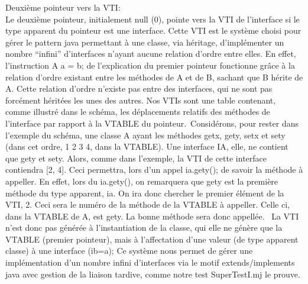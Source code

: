 Deuxième pointeur vers la VTI:\\
Le deuxième pointeur, initialement null (0), pointe vers la VTI de l'interface
si le type apparent du pointeur est une interface. Cette VTI est le système
choisi pour gérer le pattern java permettant à une classe, via héritage,
d'implémenter un nombre ``infini'' d'interfaces n'ayant aucune relation d'ordre
entre elles. En effet, l'instruction A a = b; de l'explication du premier
pointeur fonctionne grâce à la relation d'ordre existant entre les méthodes de A
et de B, sachant que B hérite de A. Cette relation d'ordre n'existe pas entre
des interfaces, qui ne sont pas forcément héritées les unes des autres.
Nos VTIs sont une table contenant, comme illustré dans le schéma, les déplacements
relatifs des méthodes de l'interface par rapport à la VTABLE du pointeur.\
Considérons, pour rester dans l'exemple du schéma, une classe A ayant les
méthodes getx, gety, setx et sety (dans cet ordre, 1 2 3 4, dans la VTABLE). Une
interface IA, elle, ne contient que gety et sety. Alors, comme dans l'exemple,
la VTI de cette interface contiendra [2, 4]. Ceci permettra, lors d'un appel
ia.gety(); de savoir la méthode à appeller. En effet, lors du ia.gety(), on
remarquera que gety est la première méthode du type apparent, ia. On ira donc
chercher le premier élément de la VTI, 2. Ceci sera le numéro de la méthode de
la VTABLE à appeller. Celle ci, dans la VTABLE de A, est gety. La bonne méthode
sera donc appellée. \
La VTI n'est donc pas générée à l'instantiation de la classe, qui elle ne génère
que la VTABLE (premier pointeur), mais à l'affectation d'une valeur (de type
apparent classe) à une interface (ib=a); Ce système nous permet de gérer une
implémentation d'un nombre infini d'interfaces via le motif extends/implements
java avec gestion de la liaison tardive, comme notre test SuperTestI.mj le
prouve. 


